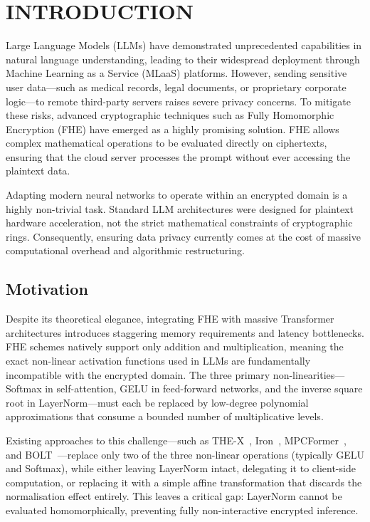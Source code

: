 \chapter{INTRODUCTION}
\label{ch:introduction}

Large Language Models (LLMs) have demonstrated unprecedented capabilities in natural language understanding, leading to their widespread deployment through Machine Learning as a Service (MLaaS) platforms. However, sending sensitive user data---such as medical records, legal documents, or proprietary corporate logic---to remote third-party servers raises severe privacy concerns. To mitigate these risks, advanced cryptographic techniques such as Fully Homomorphic Encryption (FHE) have emerged as a highly promising solution. FHE allows complex mathematical operations to be evaluated directly on ciphertexts, ensuring that the cloud server processes the prompt without ever accessing the plaintext data.

Adapting modern neural networks to operate within an encrypted domain is a highly non-trivial task. Standard LLM architectures were designed for plaintext hardware acceleration, not the strict mathematical constraints of cryptographic rings. Consequently, ensuring data privacy currently comes at the cost of massive computational overhead and algorithmic restructuring.

\section{Motivation}
Despite its theoretical elegance, integrating FHE with massive Transformer architectures introduces staggering memory requirements and latency bottlenecks. FHE schemes natively support only addition and multiplication, meaning the exact non-linear activation functions used in LLMs are fundamentally incompatible with the encrypted domain. The three primary non-linearities---Softmax in self-attention, GELU in feed-forward networks, and the inverse square root in LayerNorm---must each be replaced by low-degree polynomial approximations that consume a bounded number of multiplicative levels.

Existing approaches to this challenge---such as THE-X~\cite{chen2022thex}, Iron~\cite{hao2022iron}, MPCFormer~\cite{li2023mpcformer}, and BOLT~\cite{pang2024bolt}---replace only two of the three non-linear operations (typically GELU and Softmax), while either leaving LayerNorm intact, delegating it to client-side computation, or replacing it with a simple affine transformation that discards the normalisation effect entirely. This leaves a critical gap: LayerNorm cannot be evaluated homomorphically, preventing fully non-interactive encrypted inference.

